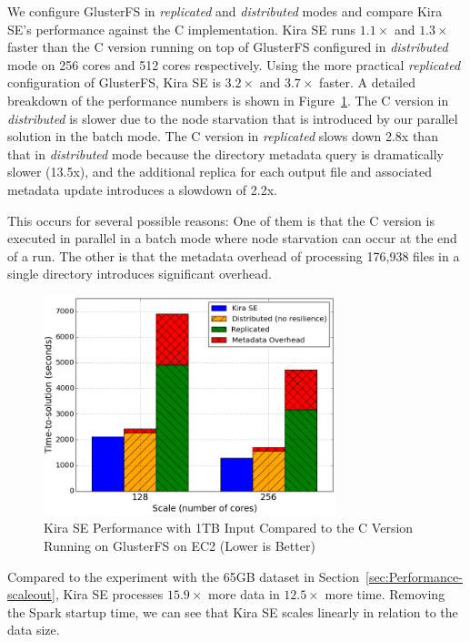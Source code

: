 \documentclass[conference]{IEEEtran}
\newcommand{\up}{\vspace*{-1em}}
\begin{document}
We configure GlusterFS in \emph{replicated} and \emph{distributed} modes and compare Kira
SE's performance against the C implementation. Kira SE runs $1.1\times$ and $1.3\times$ faster than the C version running on top of
GlusterFS configured in \emph{distributed} mode on 256 cores and 512 cores respectively. 
Using the more practical \emph{replicated} configuration of GlusterFS, Kira SE
is $3.2\times$ and $3.7\times$ faster. A detailed breakdown of the performance numbers is shown in Figure~\ref{fig:1tb-ec2}.
The C version in \emph{distributed} is slower due to the node starvation that is introduced by our parallel solution in the batch mode.
The C version in \emph{replicated} slows down 2.8x than that in \emph{distributed} mode because the directory metadata query
is dramatically slower (13.5x), and the additional replica for each output file and associated metadata update introduces a slowdown
of 2.2x.

This occurs for several possible reasons: One of them is that the C version is executed in parallel in a batch mode 
where node starvation can occur at the end of a run. The other is that the metadata overhead of processing 176,938 files in a 
single directory introduces significant overhead.

\begin{figure}[t]
	\begin{center}
		\includegraphics[width=85mm]{pictures/1TB-EC2}
		\caption{Kira SE Performance with 1TB Input Compared to the C Version Running on GlusterFS on EC2 (Lower is Better)
		\label{fig:1tb-ec2}}
		\up\up
  	\end{center}
\end{figure}

Compared to the experiment with the 65GB dataset in Section~\ref{sec:Performance-scaleout},
Kira SE processes $15.9\times$ more data in $12.5\times$ more time. Removing the Spark
startup time, we can see that Kira SE scales linearly in relation to the data size.
\end{document}
